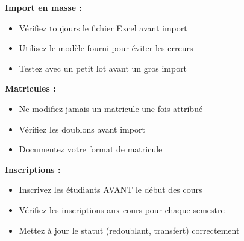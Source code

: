 \begin{tcolorbox}[colback=green!5!white,colframe=green!75!black,title=Recommandations]

\textbf{Import en masse :}
\begin{itemize}[leftmargin=*]
    \item Vérifiez toujours le fichier Excel avant import
    \item Utilisez le modèle fourni pour éviter les erreurs
    \item Testez avec un petit lot avant un gros import
\end{itemize}

\textbf{Matricules :}
\begin{itemize}[leftmargin=*]
    \item Ne modifiez jamais un matricule une fois attribué
    \item Vérifiez les doublons avant import
    \item Documentez votre format de matricule
\end{itemize}

\textbf{Inscriptions :}
\begin{itemize}[leftmargin=*]
    \item Inscrivez les étudiants AVANT le début des cours
    \item Vérifiez les inscriptions aux cours pour chaque semestre
    \item Mettez à jour le statut (redoublant, transfert) correctement
\end{itemize}
\end{tcolorbox}

\newpage
